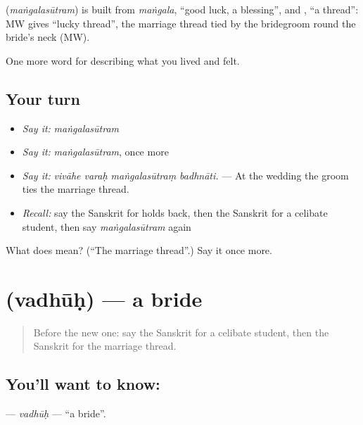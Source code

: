 \begin{cousinweb}
\textbf{} (\emph{maṅgalasūtram}) is built from \emph{maṅgala}, \textquotedblleft{}good luck, a blessing\textquotedblright{}, and \textbf{}, \textquotedblleft{}a thread\textquotedblright{}: MW gives \textquotedblleft{}lucky thread\textquotedblright{}, the marriage thread tied by the bridegroom round the bride's neck (MW).
\end{cousinweb}

\begin{grammarlens}[title={What you've built}]
One more word for describing what you lived and felt.
\end{grammarlens}

\subsection*{Your turn}
\begin{itemize}
\raggedright
  \item \emph{Say it:} \emph{maṅgalasūtram}
  \item \emph{Say it:} \emph{maṅgalasūtram}, once more
  \item \emph{Say it:} \emph{vivāhe varaḥ maṅgalasūtraṃ badhnāti.} — At the wedding the groom ties the marriage thread.
  \item \emph{Recall:} say the Sanskrit for holds back, then the Sanskrit for a celibate student, then say \emph{maṅgalasūtram} again
\end{itemize}

\begin{tcolorbox}[breakable,colback=teal!4,colframe=teal!35!black,title={Before you move on}]
What does  mean? (\textquotedblleft{}The marriage thread\textquotedblright{}.) Say it once more.
\end{tcolorbox}
\section[\texorpdfstring{\sk{वधूः} (vadhūḥ)}{वधूः (vadhūḥ)}]{ (vadhūḥ) — a bride}

\label{lesson:SA-C496-vadhuh}



\begin{quote}
Before the new one: say the Sanskrit for a celibate student, then the Sanskrit for the marriage thread.
\end{quote}

\subsection*{You'll want to know: }
\textbf{} — \emph{vadhūḥ} — \textquotedblleft{}a bride\textquotedblright{}.

